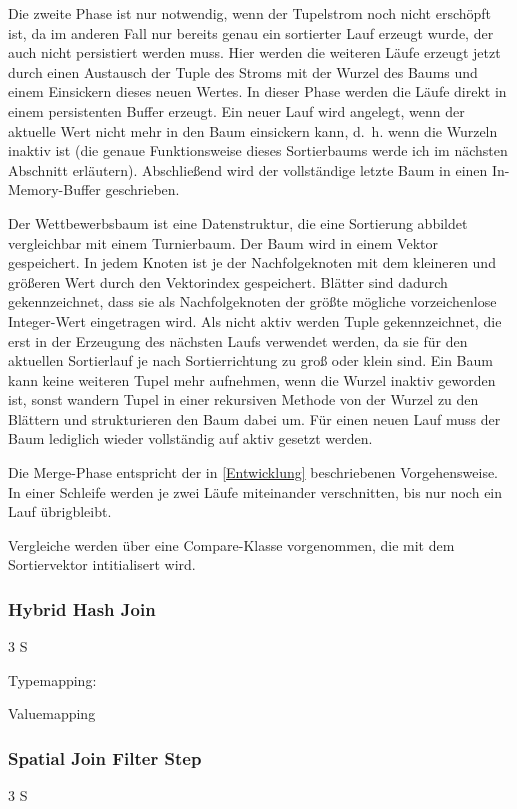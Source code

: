 \documentclass[a4paper,12pt,twoside]{article}
\begin{document}
Die zweite Phase ist nur notwendig, wenn der Tupelstrom noch nicht erschöpft ist, da im anderen Fall nur bereits genau ein sortierter Lauf erzeugt wurde, der auch nicht persistiert werden muss. Hier werden die weiteren Läufe erzeugt jetzt durch einen Austausch der Tuple des Stroms mit der Wurzel des Baums und einem Einsickern dieses neuen Wertes. In dieser Phase werden die Läufe direkt in einem persistenten Buffer erzeugt. Ein neuer Lauf wird angelegt, wenn der aktuelle Wert nicht mehr in den Baum einsickern kann, d.~h. wenn die Wurzeln inaktiv ist (die genaue Funktionsweise dieses Sortierbaums werde ich im nächsten Abschnitt erläutern). Abschließend wird der vollständige letzte Baum in einen In-Memory-Buffer geschrieben.

Der Wettbewerbsbaum ist eine Datenstruktur, die eine Sortierung abbildet vergleichbar mit einem Turnierbaum. Der Baum wird in einem Vektor gespeichert. In jedem Knoten ist je der Nachfolgeknoten mit dem kleineren und größeren Wert durch den Vektorindex gespeichert. Blätter sind dadurch gekennzeichnet, dass sie als Nachfolgeknoten der größte mögliche vorzeichenlose Integer-Wert eingetragen wird. Als nicht aktiv werden Tuple gekennzeichnet, die erst in der Erzeugung des nächsten Laufs verwendet werden, da sie für den aktuellen Sortierlauf je nach Sortierrichtung zu groß oder klein sind. Ein Baum kann keine weiteren Tupel mehr aufnehmen, wenn die Wurzel inaktiv geworden ist, sonst wandern Tupel in einer rekursiven Methode von der Wurzel zu den Blättern und strukturieren den Baum dabei um. Für einen neuen Lauf muss der Baum lediglich wieder vollständig auf aktiv gesetzt werden. 

Die Merge-Phase entspricht der in \autoref{Entwicklung} beschriebenen Vorgehensweise. In einer Schleife werden je zwei Läufe miteinander verschnitten, bis nur noch ein Lauf übrigbleibt.

Vergleiche werden über eine Compare-Klasse vorgenommen, die mit dem Sortiervektor intitialisert wird. 

\subsubsection{Hybrid Hash Join} 3 S

Typemapping:

Valuemapping

\subsubsection{Spatial Join Filter Step} 3 S
\end{document}
